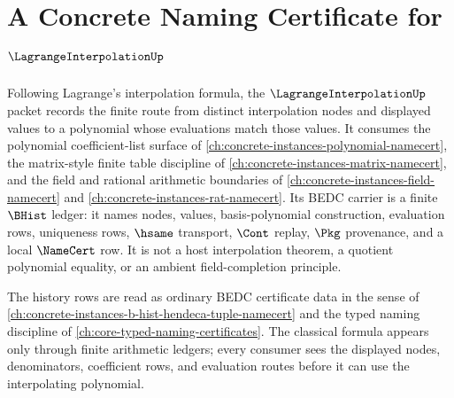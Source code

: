 \chapter{A Concrete Naming Certificate for $\LagrangeInterpolationUp$}
\label{ch:concrete-instances-lagrange-interpolation-namecert}

Following Lagrange's interpolation formula, the $\LagrangeInterpolationUp$
packet records the finite route from distinct interpolation nodes and displayed
values to a polynomial whose evaluations match those values. It consumes the
polynomial coefficient-list surface of
\autoref{ch:concrete-instances-polynomial-namecert}, the matrix-style finite
table discipline of \autoref{ch:concrete-instances-matrix-namecert}, and the
field and rational arithmetic boundaries of
\autoref{ch:concrete-instances-field-namecert} and
\autoref{ch:concrete-instances-rat-namecert}. Its BEDC carrier is a finite
$\BHist$ ledger: it names nodes, values, basis-polynomial construction,
evaluation rows, uniqueness rows, $\hsame$ transport, $\Cont$ replay, $\Pkg$
provenance, and a local $\NameCert$ row. It is not a host interpolation
theorem, a quotient polynomial equality, or an ambient field-completion
principle.

The history rows are read as ordinary BEDC certificate data in the sense of
\autoref{ch:concrete-instances-b-hist-hendeca-tuple-namecert} and the typed
naming discipline of \autoref{ch:core-typed-naming-certificates}. The classical
formula appears only through finite arithmetic ledgers; every consumer sees the
displayed nodes, denominators, coefficient rows, and evaluation routes before
it can use the interpolating polynomial.

